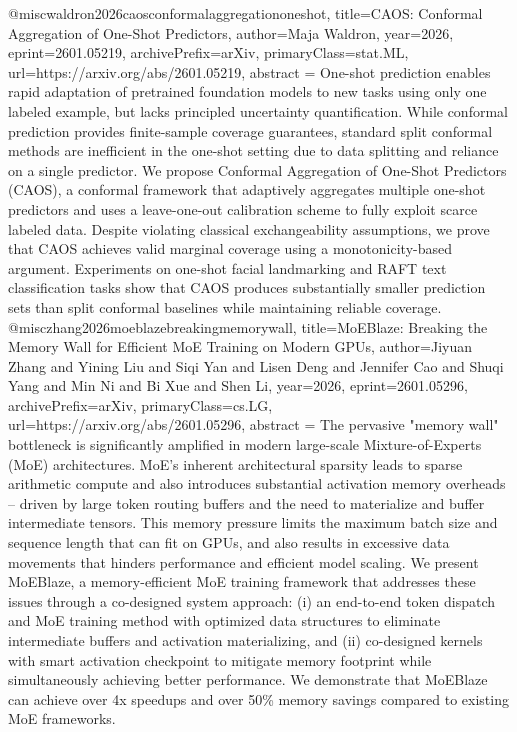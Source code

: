 {}@misc{waldron2026caosconformalaggregationoneshot,
      title={CAOS: Conformal Aggregation of One-Shot Predictors}, 
      author={Maja Waldron},
      year={2026},
      eprint={2601.05219},
      archivePrefix={arXiv},
      primaryClass={stat.ML},
      url={https://arxiv.org/abs/2601.05219},
      abstract = {One-shot prediction enables rapid adaptation of pretrained foundation models to new tasks using only one labeled example, but lacks principled uncertainty quantification. While conformal prediction provides finite-sample coverage guarantees, standard split conformal methods are inefficient in the one-shot setting due to data splitting and reliance on a single predictor. We propose Conformal Aggregation of One-Shot Predictors (CAOS), a conformal framework that adaptively aggregates multiple one-shot predictors and uses a leave-one-out calibration scheme to fully exploit scarce labeled data. Despite violating classical exchangeability assumptions, we prove that CAOS achieves valid marginal coverage using a monotonicity-based argument. Experiments on one-shot facial landmarking and RAFT text classification tasks show that CAOS produces substantially smaller prediction sets than split conformal baselines while maintaining reliable coverage.}
}@misc{zhang2026moeblazebreakingmemorywall,
      title={MoEBlaze: Breaking the Memory Wall for Efficient MoE Training on Modern GPUs}, 
      author={Jiyuan Zhang and Yining Liu and Siqi Yan and Lisen Deng and Jennifer Cao and Shuqi Yang and Min Ni and Bi Xue and Shen Li},
      year={2026},
      eprint={2601.05296},
      archivePrefix={arXiv},
      primaryClass={cs.LG},
      url={https://arxiv.org/abs/2601.05296},
      abstract = {The pervasive "memory wall" bottleneck is significantly amplified in modern large-scale Mixture-of-Experts (MoE) architectures. MoE's inherent architectural sparsity leads to sparse arithmetic compute and also introduces substantial activation memory overheads -- driven by large token routing buffers and the need to materialize and buffer intermediate tensors. This memory pressure limits the maximum batch size and sequence length that can fit on GPUs, and also results in excessive data movements that hinders performance and efficient model scaling. We present MoEBlaze, a memory-efficient MoE training framework that addresses these issues through a co-designed system approach: (i) an end-to-end token dispatch and MoE training method with optimized data structures to eliminate intermediate buffers and activation materializing, and (ii) co-designed kernels with smart activation checkpoint to mitigate memory footprint while simultaneously achieving better performance. We demonstrate that MoEBlaze can achieve over 4x speedups and over 50\% memory savings compared to existing MoE frameworks.}
}
